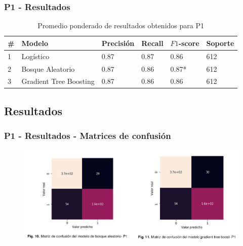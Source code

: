 \documentclass[xcolor=dvipsnames, compress]{beamer}
\begin{document}
\begin{frame}
\frametitle{P1 - Resultados}


\begin{table}[tbhp]
	\centering

	\label{tab:p1_results}
	\begin{tabular}{@{}llllll@{}}
		\hline
		\# & Modelo & Precisión & Recall & $F1$-score & Soporte \\ \hline
		1 & Logístico & 0.87 & 0.87 & 0.86 & 612 \\
		2 & Bosque Aleatorio & 0.87 & 0.86 & 0.87* & 612 \\
		3 & Gradient Tree Boosting & 0.87 & 0.86 & 0.86 & 612 \\ \hline
	\end{tabular}

	\caption{Promedio ponderado de resultados obtenidos para P1 }
\end{table}

\end{frame}


\begin{frame}
\section{Resultados}
\frametitle{P1 - Resultados - Matrices de confusión}
\begin{figure}
	\includegraphics[scale=0.5]{images/p1_results_matrix.png}
\end{figure}
\end{frame}
\end{document}
